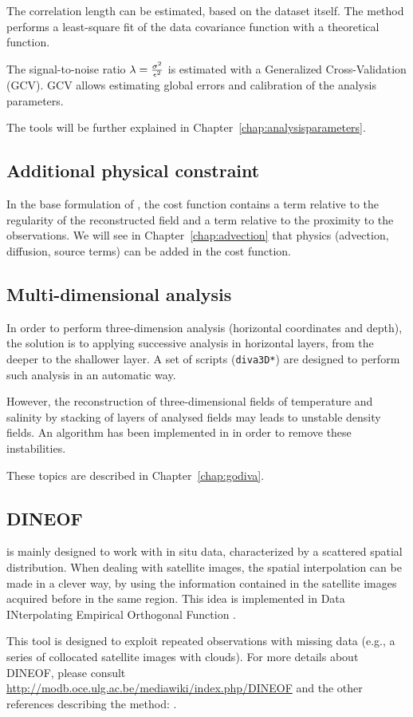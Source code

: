 The correlation length can be estimated, based on the dataset itself. The method performs a least-square fit of the data covariance function with a theoretical function. 

The signal-to-noise ratio $\lambda=\frac{\sigma^{2}}{\epsilon^{2}}$ is estimated with a Generalized Cross-Validation (GCV). GCV allows estimating global errors and calibration of the analysis parameters. 

The tools will be further explained in Chapter~\ref{chap:analysisparameters}.
 
\subsection{Additional physical constraint}

In the base formulation of \diva, the cost function contains a term relative to the regularity of the reconstructed field and a term relative to the proximity to the observations. We will see in Chapter~\ref{chap:advection} that physics (advection, diffusion, source terms) can be added in the cost function.

\subsection{Multi-dimensional analysis}

In order to perform three-dimension analysis (horizontal coordinates and depth), the solution is to applying successive analysis in horizontal layers, from the deeper to the shallower layer. A set of scripts (\texttt{diva3D*}) are designed to perform such analysis in an automatic way.

However, the reconstruction of three-dimensional fields of temperature and salinity by stacking of layers of analysed fields may leads to unstable density fields. An algorithm has been implemented in \diva in order to remove these instabilities.

These topics are described in Chapter~\ref{chap:godiva}.


\subsection{DINEOF\label{sec:DINEOF}}

\diva is mainly designed to work with in situ data, characterized by a scattered spatial distribution. When dealing with satellite images, the spatial interpolation can be made in a clever way, by using the information contained in the satellite images acquired before in the same region. This idea is implemented in Data INterpolating Empirical Orthogonal Function \citep[DINEOF;][]{BECKERS03,ALVERA05}.

This tool is designed to exploit repeated observations with missing data (e.g., a series of collocated satellite images with clouds). 
For more details about DINEOF, please consult \url{http://modb.oce.ulg.ac.be/mediawiki/index.php/DINEOF} and the other references describing the method: \citet{ALVERA05,ALVERA07,ALVERA09,BECKERS06}.


